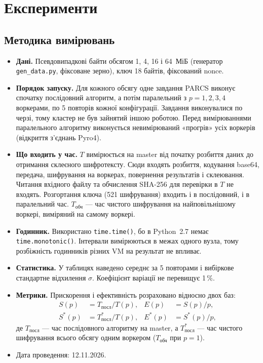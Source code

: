 \documentclass[a4paper,12pt]{article}
\begin{document}
\section{Експерименти}
\subsection{Методика вимірювань}
\begin{itemize}
  \item \textbf{Дані.} Псевдовипадкові байти обсягом 1, 4, 16 і 64~МіБ
        (генератор \texttt{gen\_data.py}, фіксоване зерно), ключ 18 байтів, фіксований nonce.
  \item \textbf{Порядок запуску.} Для кожного обсягу одне завдання PARCS виконує спочатку
        послідовний алгоритм, а потім паралельний з $p = 1, 2, 3, 4$ воркерами, по 5 повторів
        кожної конфігурації. Завдання виконувалися по черзі, тому кластер не був зайнятий
        іншою роботою. Перед вимірюваннями паралельного алгоритму виконується невимірюваний
        «прогрів» усіх воркерів (відкриття з'єднань Pyro4).
  \item \textbf{Що входить у час.} $T$ вимірюється на master від початку розбиття даних до
        отримання склеєного шифротексту. Сюди входять розбиття, кодування base64, передача,
        шифрування на воркерах, повернення результатів і склеювання. Читання вхідного файлу
        та обчислення SHA-256 для перевірки в $T$ не входять. Розгортання ключа (521 шифрування)
        входить і в послідовний, і в паралельний час. $T_{\text{обч}}$ --- час чистого
        шифрування на найповільнішому воркері, виміряний на самому воркері.
  \item \textbf{Годинник.} Використано \texttt{time.time()}, бо в Python~2.7 немає
        \texttt{time.monotonic()}. Інтервали вимірюються в межах одного вузла, тому
        розбіжність годинників різних VM на результат не впливає.
  \item \textbf{Статистика.} У таблицях наведено середнє за 5 повторами і вибіркове
        стандартне відхилення $\sigma$. Коефіцієнт варіації не перевищує 1\,\%.
  \item \textbf{Метрики.} Прискорення і ефективність розраховано відносно двох баз:
        \begin{align*}
          S(p)   &= T_{\text{посл}} / T(p),   & E(p)   &= S(p)/p, \\
          S^*(p) &= T^*_{\text{посл}} / T(p), & E^*(p) &= S^*(p)/p,
        \end{align*}
        де $T_{\text{посл}}$ --- час послідовного алгоритму на master, а $T^*_{\text{посл}}$ ---
        час чистого шифрування всього обсягу одним воркером ($T_{\text{обч}}$ при $p=1$).
  \item Дата проведення: 12.11.2026.
\end{itemize}
\end{document}
